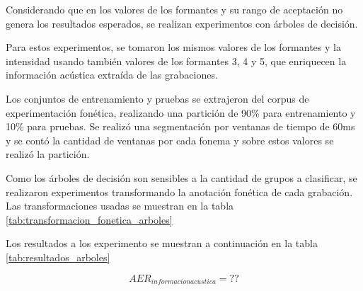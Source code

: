 Considerando que en los valores de los formantes y su rango de aceptación no genera los resultados esperados, se realizan experimentos con árboles de decisión.

Para estos experimentos, se tomaron los mismos valores de los formantes y la intensidad usando también valores de los formantes 3, 4 y 5, que enriquecen la información acústica extraída de las grabaciones.

Los conjuntos de entrenamiento y pruebas se extrajeron del corpus de experimentación fonética, realizando una partición de 90\% para entrenamiento y 10\% para pruebas. Se realizó una segmentación por ventanas de tiempo de 60ms y se contó la cantidad de ventanas por cada fonema y sobre estos valores se realizó la partición.

Como los árboles de decisión son sensibles a la cantidad de grupos a clasificar, se realizaron experimentos transformando la anotación fonética de cada grabación. Las transformaciones usadas se muestran en la tabla \ref{tab:transformacion_fonetica_arboles}



Los resultados a los experimento se muestran a continuación en la tabla \ref{tab:resultados_arboles}




\begin{equation}
    AER_{informacion acustica} = ??
\end{equation}